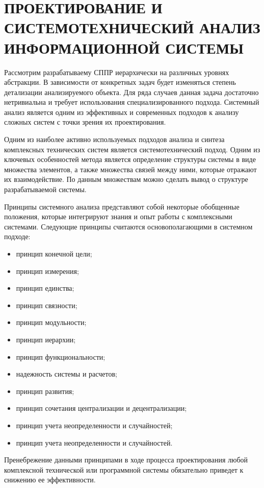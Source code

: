 \section{ПРОЕКТИРОВАНИЕ И СИСТЕМОТЕХНИЧЕСКИЙ АНАЛИЗ ИНФОРМАЦИОННОЙ СИСТЕМЫ}

Рассмотрим разрабатываему СППР иерархически на различных уровнях абстракции. 
В зависимости от конкретных задач будет изменяться степень детализации анализируемого объекта. 
Для ряда случаев данная задача достаточно нетривиальна и требует использования специализированного подхода. 
Системный анализ является одним из эффективных и современных подходов к анализу сложных систем с точки зрения их проектирования.

Одним из наиболее активно используемых подходов анализа и синтеза комплексных технических систем является системотехнический подход. 
Одним из ключевых особенностей метода является определение структуры системы в виде множества элементов, а также множества связей между ними, которые отражают их взаимодействие. 
По данным множествам можно сделать вывод о структуре разрабатываемой системы.

Принципы системного анализа представляют собой некоторые обобщенные положения, которые интегрируют знания и опыт работы с комплексными системами. 
Следующие принципы считаются основополагающими в системном подходе: 

\begin{itemize}
    \item принцип конечной цели;
    \item принцип измерения;
    \item принцип единства;
    \item принцип связности;
    \item принцип модульности;
    \item принцип иерархии;
    \item принцип функциональности;
    \item надежность системы и расчетов;
    \item принцип развития;
    \item принцип сочетания централизации и децентрализации;
    \item принцип учета неопределенности и случайностей;
    \item принцип учета неопределенности и случайностей.
\end{itemize}

Пренебрежение данными принципами в ходе процесса проектирования любой комплексной технической или программной системы обязательно приведет к снижению ее эффективности.

